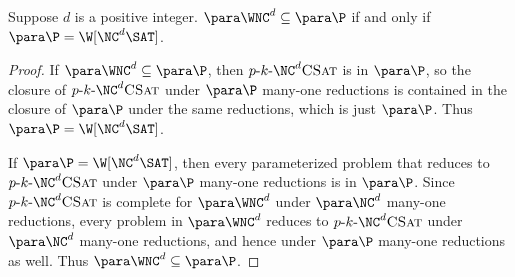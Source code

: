 \begin{theorem}
  Suppose $d$ is a positive integer.
  $\para \WNC^d \subseteq \para \P$ if and only if $\para \P = \W[\NC^d \SAT]$.
\end{theorem}
\begin{proof}
  If $\para \WNC^d \subseteq \para \P$, then $\pNCSAT$ is in $\para \P$, so the closure of $\pNCSAT$ under $\para \P$ many-one reductions is contained in the closure of $\para \P$ under the same reductions, which is just $\para \P$.
  Thus $\para \P = \W[\NC^d \SAT]$.

  If $\para \P = \W[\NC^d \SAT]$, then every parameterized problem that reduces to $\pNCSAT$ under $\para \P$ many-one reductions is in $\para \P$.
  Since $\pNCSAT$ is complete for $\para \WNC^d$ under $\para \NC^d$ many-one reductions, every problem in $\para \WNC^d$ reduces to $\pNCSAT$ under $\para \NC^d$ many-one reductions, and hence under $\para \P$ many-one reductions as well.
  Thus $\para \WNC^d \subseteq \para \P$.
\end{proof}
